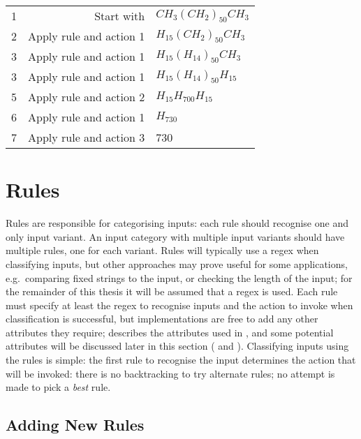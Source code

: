 \begin{tabular}{lrl}

    1 & Start with              & $CH_{3}{(CH_{2})}_{50}CH_{3}$ \\
    2 & Apply rule and action 1 & $H_{15}{(CH_{2})}_{50}CH_{3}$ \\
    3 & Apply rule and action 1 & $H_{15}{(H_{14})}_{50}CH_{3}$ \\
    3 & Apply rule and action 1 & $H_{15}{(H_{14})}_{50}H_{15}$ \\
    5 & Apply rule and action 2 & $H_{15}H_{700}H_{15}$ \\
    6 & Apply rule and action 1 & $H_{730}$ \\
    7 & Apply rule and action 3 & 730 \\

\end{tabular}

\section{Rules}

\label{rules in architecture}

Rules are responsible for categorising inputs: each rule should recognise
one and only input variant.  An input category with multiple input variants
should have multiple rules, one for each variant.  Rules will typically use
a regex when classifying inputs, but other approaches may prove useful for
some applications, e.g.\ comparing fixed strings to the input, or checking
the length of the input; for the remainder of this thesis it will be
assumed that a regex is used.  Each rule must specify at least the regex to
recognise inputs and the action to invoke when classification is
successful, but implementations are free to add any other attributes they
require;  describes the attributes used in
\parsername{}, and some potential attributes will be discussed later in
this section ( and
).  Classifying inputs using
the rules is simple: the first rule to recognise the input determines the
action that will be invoked: there is no backtracking to try alternate
rules; no attempt is made to pick a \textit{best\/} rule.

\subsection{Adding New Rules}

